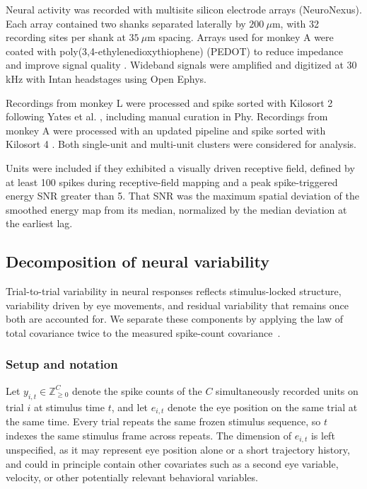 \documentclass{lite}
\begin{document}
Neural activity was recorded with multisite silicon electrode arrays (NeuroNexus). Each array contained two shanks separated laterally by $200~\mu\mathrm{m}$, with 32 recording sites per shank at $35~\mu\mathrm{m}$ spacing. Arrays used for monkey A were coated with poly(3,4-ethylenedioxythiophene) (PEDOT) to reduce impedance and improve signal quality \cite{cui2003electrochemical}. Wideband signals were amplified and digitized at 30 kHz with Intan headstages using Open Ephys.

Recordings from monkey L were processed and spike sorted with Kilosort 2 following Yates et al. \cite{yates2023detailed}, including manual curation in Phy. Recordings from monkey A were processed with an updated pipeline and spike sorted with Kilosort 4 \cite{roth2026flexible}. Both single-unit and multi-unit clusters were considered for analysis.

Units were included if they exhibited a visually driven receptive field, defined by at least 100 spikes during receptive-field mapping and a peak spike-triggered energy SNR greater than 5. That SNR was the maximum spatial deviation of the smoothed energy map from its median, normalized by the median deviation at the earliest lag.

\subsection{Decomposition of neural variability}

Trial-to-trial variability in neural responses reflects stimulus-locked structure, variability driven by eye movements, and residual variability that remains once both are accounted for. We separate these components by applying the law of total covariance twice to the measured spike-count covariance~\cite{mcfarland2016variability}.

\subsubsection{Setup and notation}

Let $y_{i,t} \in \mathbb{Z}_{\geq 0}^{C}$ denote the spike counts of the $C$ simultaneously recorded units on trial $i$ at stimulus time $t$, and let $e_{i,t}$ denote the eye position on the same trial at the same time. Every trial repeats the same frozen stimulus sequence, so $t$ indexes the same stimulus frame across repeats. The dimension of $e_{i,t}$ is left unspecified, as it may represent eye position alone or a short trajectory history, and could in principle contain other covariates such as a second eye variable, velocity, or other potentially relevant behavioral variables.
\end{document}

